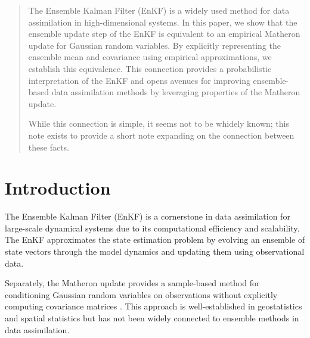 \documentclass{article}
\theoremstyle{plain}
\begin{document}

\printAffiliationsAndNotice{}  %

\begin{abstract}
The Ensemble Kalman Filter (EnKF) is a widely used method for data assimilation in high-dimensional systems. In this paper, we show that the ensemble update step of the EnKF is equivalent to an empirical Matheron update for Gaussian random variables. By explicitly representing the ensemble mean and covariance using empirical approximations, we establish this equivalence. This connection provides a probabilistic interpretation of the EnKF and opens avenues for improving ensemble-based data assimilation methods by leveraging properties of the Matheron update.

While this connection is simple, it seems not to be whidely known; this note exists to provide a short note expanding on the connection between these facts.
\end{abstract}

\section{Introduction}
The Ensemble Kalman Filter (EnKF) \citep{Evensen2003Ensemble,Evensen2009Data} is a cornerstone in data assimilation for large-scale dynamical systems due to its computational efficiency and scalability.
The EnKF approximates the state estimation problem by evolving an ensemble of state vectors through the model dynamics and updating them using observational data.

Separately, the Matheron update provides a sample-based method for conditioning Gaussian random variables on observations without explicitly computing covariance matrices \citep{Doucet2010Note,Wilson2020Efficiently,Wilson2021Pathwise}.
This approach is well-established in geostatistics and spatial statistics but has not been widely connected to ensemble methods in data assimilation.
\end{document}
